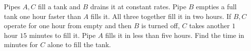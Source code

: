 Pipes $A,C$ fill a tank and $B$ drains it at constant rates. Pipe $B$ empties a full tank one hour faster than $A$ fills it. All three together fill it in two hours. If $B,C$ operate for one hour from empty and then $B$ is turned off, $C$ takes another $1$ hour $15$ minutes to fill it. Pipe $A$ fills it in less than five hours. Find the time in minutes for $C$ alone to fill the tank.

